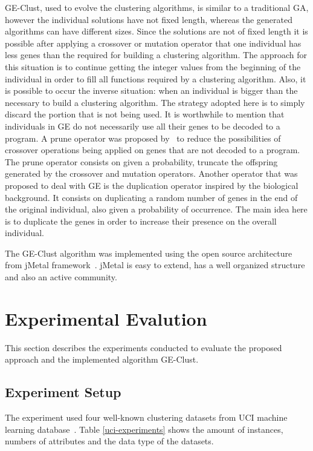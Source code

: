 \documentclass[journal]{IEEEtran}
\begin{document}
	GE-Clust, used to evolve the clustering algorithms, is similar to a traditional GA, however the individual solutions have not fixed length, whereas the generated algorithms can have different sizes. Since the solutions are not of fixed length it is possible after applying a crossover or mutation operator that one individual has less genes than the required for building a clustering algorithm. The approach for this situation is to continue getting the integer values from the beginning of the individual in order to fill all functions required by a clustering algorithm. Also, it is possible to occur the inverse situation: when an individual is bigger than the necessary to build a clustering algorithm. The strategy adopted here is to simply discard the portion that is not being used. It is worthwhile to mention that individuals in GE do not necessarily use all their genes to be decoded to a program. A prune operator was proposed by~\cite{ryan1998grammatical} to reduce the possibilities of crossover operations being applied on genes that are not decoded to a program. The prune operator consists on given a probability, truncate the offspring generated by the crossover and mutation operators. Another operator that was proposed to deal with GE is the duplication operator inspired by the biological background. It consists on duplicating a random number of genes in the end of the original individual, also given a probability of occurrence. The main idea here is to duplicate the genes in order to increase their presence on the overall individual.
	
	The GE-Clust algorithm was implemented using the open source architecture from jMetal framework~\cite{jMetal}. jMetal is  easy to extend, has a well organized structure and also an active community.  



\section{Experimental Evalution} \label{sec:experiments}
	
This section describes the experiments conducted to evaluate the proposed approach and the implemented algorithm GE-Clust.

\subsection{Experiment Setup}

	
The experiment used four well-known clustering datasets from UCI machine learning database~\cite{uci}. Table \ref{uci-experiments} shows the amount of instances, numbers of attributes and the data type of the datasets. 
	
\end{document}
